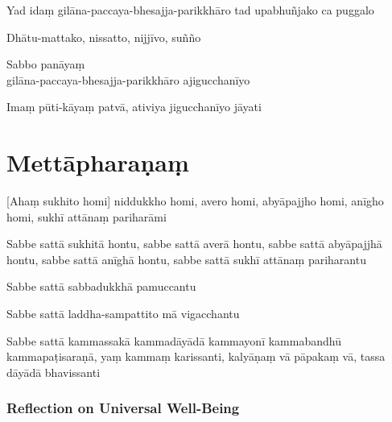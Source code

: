 Yad idaṃ gilāna-paccaya-bhesajja-parikkhāro tad upabhuñjako ca puggalo


Dhātu-mattako, nissatto, nijjīvo, suñño


Sabbo panāyaṃ\\
gilāna-paccaya-bhesajja-parikkhāro ajigucchanīyo


Imaṃ pūti-kāyaṃ patvā, ativiya jigucchanīyo jāyati


\section{Mettāpharaṇaṃ}

\begin{leader}
\end{leader}


[Ahaṃ sukhito homi] niddukkho homi, avero homi, abyāpajjho homi, anīgho homi,
sukhī attānaṃ pariharāmi

Sabbe sattā sukhitā hontu, sabbe sattā averā hontu, sabbe sattā abyāpajjhā
hontu, sabbe sattā anīghā hontu, sabbe sattā sukhī attānaṃ pariharantu

Sabbe sattā sabbadukkhā pamuccantu

Sabbe sattā laddha-sampattito mā vigacchantu

Sabbe sattā kammassakā kammadāyādā kammayonī kammabandhū kammapaṭisaraṇā,
yaṃ kammaṃ karissanti, kalyāṇaṃ vā pāpakaṃ vā, tassa dāyādā bhavissanti


\subsubsection{Reflection on Universal Well-Being}

\begin{leader}
\end{leader}


